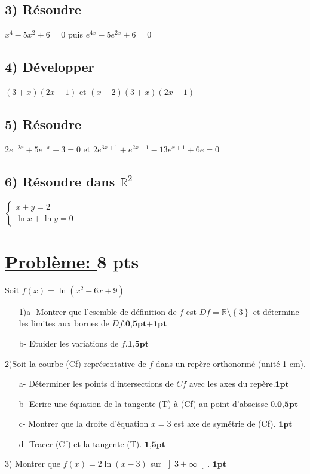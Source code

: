 \documentclass[12pt]{article}
\begin{document}
\subsection*{ 3) Résoudre } $x^{4}-5x^{2}+6=0$ puis $e^{4x}-5e^{2x}+6=0$
\subsection*{ 4) Développer } $(3+x)(2x-1)$ et $(x-2)(3+x)(2x-1)$
\subsection*{ 5) Résoudre } $2e^{-2x}+5e^{-x}-3=0$ et $2e^{3x+1}+e^{2x+1}-13e^{x+1}+6e=0$
\subsection*{ 6) Résoudre dans $\mathbb{R}^{2}$} 
\( \begin{cases}
x + y = 2 \\
\ln x + \ln y = 0
\end{cases}\)

\section*{\underline{Problème: }\textbf{8 pts}}
Soit $f(x)=\ln(x^{2}-6x+9)$
\begin{itemize}
\item[1)a-] Montrer que l'esemble de définition de $f$ est $Df=\mathbb{R}\setminus\left\lbrace 3 \right\rbrace $ et détermine les limites aux bornes de $Df$.$\textbf{0,5pt+1pt}$

\item[b-] Etuider les variations de $f$.$\textbf{1,5pt}$
\end{itemize}

2)Soit la courbe (Cf) représentative de $f$ dans un repère orthonormé (unité 1 cm).
\begin{itemize}
\item[a-]Déterminer les points d'intersections de $Cf$ avec les axes du repère.$\textbf{1pt}$

\item[b-]Ecrire une équation de la tangente (T) à (Cf) au point d'abscisse 0.$\textbf{0,5pt}$

\item[c-]Montrer que la droite d'équation $x=3$ est axe de  symétrie de (Cf). $\textbf{1pt}$

\item[d-]Tracer (Cf) et la tangente (T). $\textbf{1,5pt}$
\end{itemize}
3) Montrer que $f(x)=2\ln(x-3)$ sur $ \left]3 +\infty \right[ $. $\textbf{1pt}$
\end{document}
